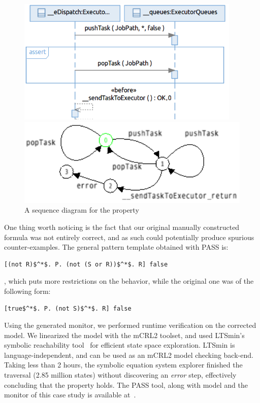 \documentclass[letter]{llncs}
\begin{document}
\begin{figure}[!b]
 \centering
\begin{minipage}[!t]{0.5\linewidth}
\includegraphics[width=0.95\textwidth]{./SDProperty.png}%
\caption{A sequence diagram for the property}
\label{fig:SDProperty}
\end{minipage}%
\begin{minipage}[t]{0.5\linewidth}
\includegraphics[width=1.0\textwidth]{./PropertyAutomaton.png}%
%
\end{minipage}
\end{figure}
One thing worth noticing is the fact that our original manually constructed formula was not entirely correct, and as such could potentially produce spurious counter-examples. 
The general pattern template obtained with PASS is:
\begin{lstlisting}[basicstyle=\sffamily\fontsize{7}{7}\selectfont,showspaces=false,showstringspaces=false,showtabs=false,mathescape]
[(not R)$^*$. P. (not (S or R))$^*$. R] false
\end{lstlisting} 
, which puts more restrictions on the behavior, while the original one was of the following form:
\begin{lstlisting}[basicstyle=\sffamily\fontsize{7}{7}\selectfont,showspaces=false,showstringspaces=false,showtabs=false,mathescape]
[true$^*$. P. (not S)$^*$. R] false
\end{lstlisting} 
Using the generated monitor, we performed runtime verification on the corrected model. We linearized the model with the mCRL2 toolset,
and used LTSmin's symbolic reachability tool~\cite{so62465} for efficient state space exploration. LTSmin is language-independent, and can be used as an mCRL2 model checking back-end. 
Taking less than 2 hours, the symbolic equation system explorer 
finished the traversal (2.85 million states) without discovering an \emph{error} step, effectively concluding that the property holds.
The PASS tool, along with model and the monitor of this case study is available at~\cite{repo:PASS}.
\vspace{-14 pt}
\end{document}
